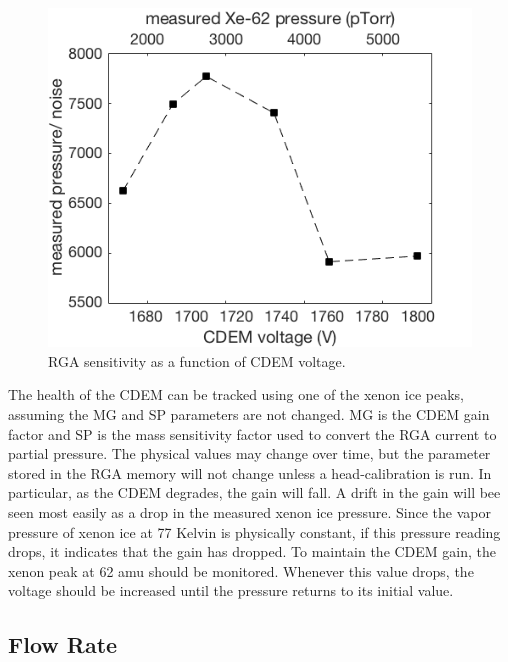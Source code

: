 \documentclass[12pt]{article}
\begin{document}
\begin{figure}[h]
  \includegraphics[width=\linewidth]{Figures/CDEM_gain_noise.png}
  \caption{RGA sensitivity as a function of CDEM voltage. }
  \label{fig:CTpid}
\end{figure}

The health of the CDEM can be tracked using one of the xenon ice peaks, assuming the MG and SP parameters are not changed. MG is the CDEM gain factor and SP is the mass sensitivity factor used to convert the RGA current to partial pressure. The physical values may change over time, but the parameter stored in the RGA memory will not change unless a head-calibration is run. In particular, as the CDEM degrades, the gain will fall. A drift in the gain will bee seen most easily as a drop in the measured xenon ice pressure. Since the vapor pressure of xenon ice at 77 Kelvin is physically constant, if this pressure reading drops, it indicates that the gain has dropped. To maintain the CDEM gain, the xenon peak at 62 amu should be monitored. Whenever this value drops, the voltage should be increased until the pressure returns to its initial value.

\subsection{Flow Rate}
\end{document}
